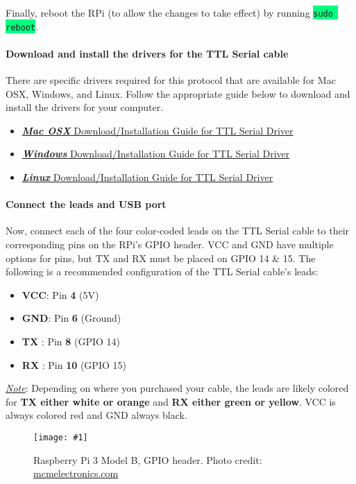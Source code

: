 \documentclass{article}
\newcommand{\codei}[1]{\colorbox{SpringGreen}{\texttt{#1}}} %
\newcommand{\imagefig}[2]{
    \begin{figure}[H]
        \centering
        \texttt{[image: \#1]}
        \caption{#2}
    \end{figure}
}
\begin{document}
    

    Finally, reboot the RPi (to allow the changes to take effect) by running \codei{sudo reboot}.

    \paragraph{Download and install the drivers for the TTL Serial cable}
    There are specific drivers required for this protocol that are available for Mac OSX, Windows, and Linux. Follow the appropriate guide below to download and install the drivers for your computer.
    \begin{itemize}
      \item \href{https://learn.adafruit.com/adafruits-raspberry-pi-lesson-5-using-a-console-cable/software-installation-mac}{\textit{\textbf{Mac OSX}} Download/Installation Guide for TTL Serial Driver}
      \item \href{https://learn.adafruit.com/adafruits-raspberry-pi-lesson-5-using-a-console-cable/software-installation-windows}{\textit{\textbf{Windows}} Download/Installation Guide for TTL Serial Driver}
      \item \href{https://learn.adafruit.com/adafruits-raspberry-pi-lesson-5-using-a-console-cable/software-installation-linux}{\textit{\textbf{Linux}} Download/Installation Guide for TTL Serial Driver}
    \end{itemize}

    \paragraph{Connect the leads and USB port}
    Now, connect each of the four color-coded leads on the TTL Serial cable to their corresponding pins on the RPi's GPIO header. VCC and GND have multiple options for pins, but TX and RX must be placed on GPIO 14 \& 15. The following is a recommended configuration of the TTL Serial cable's leads:
    \begin{itemize}
      \item \textbf{VCC}: Pin \textbf{4} (5V)
      \item \textbf{GND}: Pin \textbf{6} (Ground)
      \item \textbf{TX }: Pin \textbf{8} (GPIO 14)
      \item \textbf{RX }: Pin \textbf{10} (GPIO 15)
    \end{itemize}
    \underline{\textit{Note}}: Depending on where you purchased your cable, the leads are likely colored for \textbf{TX either white or orange} and \textbf{RX either green or yellow}. VCC is always colored red and GND always black.
    \imagefig{rpi3mb-gpio.png}{Raspberry Pi 3 Model B, GPIO header. Photo credit: \href{http://blog.mcmelectronics.com/post/Raspberry-Pi-3-GPIO-Pin-Layout}{mcmelectronics.com}}
\end{document}
